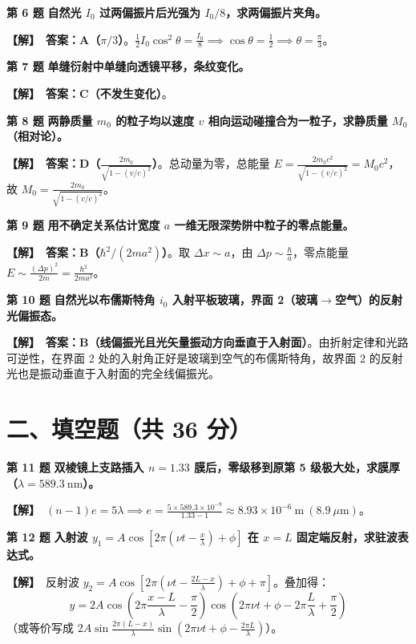 \documentclass[zihao=5,a4paper,UTF8]{ctexart}
\newenvironment{prob}[2]{%
    \par\vspace{5pt}\noindent\textbf{\color{navy}#1} \textbf{#2}\par\nopagebreak\vspace{2pt}%
}{%
    \par\vspace{3pt}%
}
\newcommand{\sol}{\noindent\textbf{\color{tealaccent}【解】}\ }
\begin{document}
\begin{prob}{第 6 题}{自然光 $I_0$ 过两偏振片后光强为 $I_0/8$，求两偏振片夹角。}
\sol \textbf{答案：A（$\pi/3$）}。$\frac{1}{2}I_0\cos^2\theta = \frac{I_0}{8} \implies \cos\theta = \frac{1}{2} \implies \theta = \frac{\pi}{3}$。
\end{prob}

\begin{prob}{第 7 题}{单缝衍射中单缝向透镜平移，条纹变化。}
\sol \textbf{答案：C（不发生变化）}。
\end{prob}

\begin{prob}{第 8 题}{两静质量 $m_0$ 的粒子均以速度 $v$ 相向运动碰撞合为一粒子，求静质量 $M_0$（相对论）。}
\sol \textbf{答案：D（$\frac{2m_0}{\sqrt{1-(v/c)^2}}$）}。总动量为零，总能量 $E = \frac{2m_0c^2}{\sqrt{1-(v/c)^2}} = M_0c^2$，故 $M_0 = \frac{2m_0}{\sqrt{1-(v/c)^2}}$。
\end{prob}

\begin{prob}{第 9 题}{用不确定关系估计宽度 $a$ 一维无限深势阱中粒子的零点能量。}
\sol \textbf{答案：B（$\hbar^2/(2ma^2)$）}。取 $\Delta x \sim a$，由 $\Delta p \sim \frac{\hbar}{a}$，零点能量 $E \sim \frac{(\Delta p)^2}{2m} = \frac{\hbar^2}{2ma^2}$。
\end{prob}

\begin{prob}{第 10 题}{自然光以布儒斯特角 $i_0$ 入射平板玻璃，界面 2（玻璃$\to$空气）的反射光偏振态。}
\sol \textbf{答案：B（线偏振光且光矢量振动方向垂直于入射面）}。由折射定律和光路可逆性，在界面 2 处的入射角正好是玻璃到空气的布儒斯特角，故界面 2 的反射光也是振动垂直于入射面的完全线偏振光。
\end{prob}

\section*{二、填空题（共 36 分）}

\begin{prob}{第 11 题}{双棱镜上支路插入 $n=1.33$ 膜后，零级移到原第 5 级极大处，求膜厚（$\lambda=589.3\ \mathrm{nm}$）。}
\sol $(n-1)e = 5\lambda \implies e = \frac{5\times 589.3\times 10^{-9}}{1.33 - 1} \approx 8.93\times 10^{-6}\ \mathrm{m}\ (8.9\ \mu\mathrm{m})$。
\end{prob}

\begin{prob}{第 12 题}{入射波 $y_1 = A\cos\left[2\pi\left(\nu t - \frac{x}{\lambda}\right) + \phi\right]$ 在 $x=L$ 固定端反射，求驻波表达式。}
\sol 反射波 $y_2 = A\cos\left[2\pi\left(\nu t - \frac{2L-x}{\lambda}\right) + \phi + \pi\right]$。叠加得：
\[
    y = 2A\cos\left(2\pi\frac{x-L}{\lambda} - \frac{\pi}{2}\right)\cos\left(2\pi\nu t + \phi - 2\pi\frac{L}{\lambda} + \frac{\pi}{2}\right)
\]
（或等价写成 $2A\sin\frac{2\pi(L-x)}{\lambda}\sin\left(2\pi\nu t + \phi - \frac{2\pi L}{\lambda}\right)$）。
\end{prob}
\end{document}

